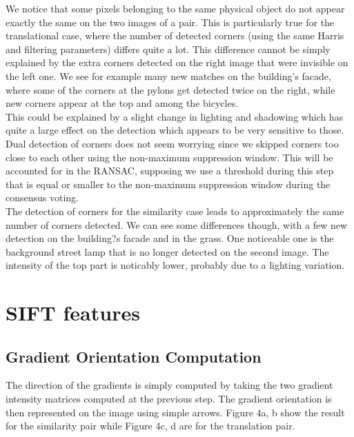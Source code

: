 \documentclass[a4paper,11pt]{article}
\begin{document}
We notice that some pixels belonging to the same physical object do not appear exactly the same on the two images of a pair.
This is particularly true for the translational case, where the number of detected corners (using the same Harris and filtering parameters) differs quite a lot. This difference cannot be simply explained by the extra corners detected on the right image that were invisible on the left one. We see for example many new matches on the building's facade, where some of the corners at the pylons get detected twice on the right, while new corners appear at the top and among the bicycles.\\
This could be explained by a slight change in lighting and shadowing which has quite a large effect on the detection which appears to be very sensitive to those.\\
Dual detection of corners does not seem worrying since we skipped corners too close to each other using the non-maximum suppression window. This will be accounted for in the RANSAC, supposing we use a threshold during this step that is equal or smaller to the non-maximum suppression window during the consensus voting.\\
The detection of corners for the similarity case leads to approximately the same number of corners detected. We can see some differences though, with a few new detection on the building?s facade and in the grass. One noticeable one is the background street lamp that is no longer detected on the second image. The intensity of the top part is noticably lower, probably due to a lighting variation.


\lstset{style=mystyle}



\section{SIFT features}

\subsection{Gradient Orientation Computation}


The direction of the gradients is simply computed by taking the two gradient intensity matrices computed at the previous step.
The gradient orientation is then represented on the image using simple arrows.
Figure 4a, b show the result for the similarity pair while Figure 4c, d are for the translation pair.
\end{document}

